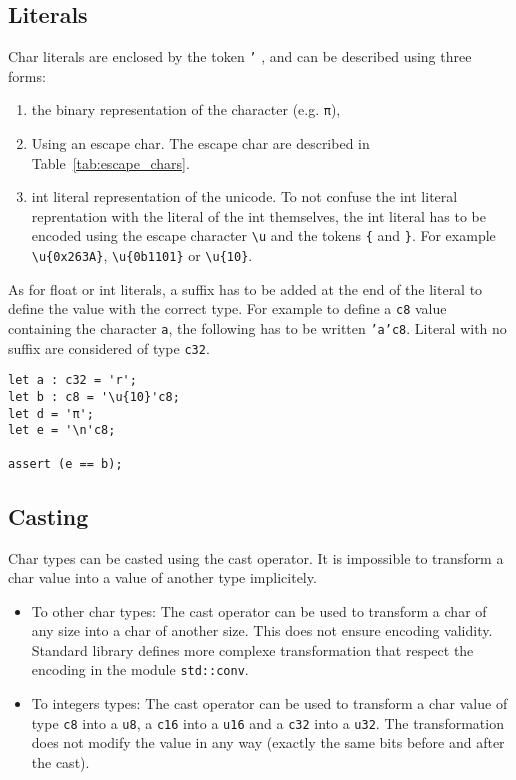 \subsection{Literals}
\label{sec:org73c4919}
Char literals are enclosed by the token \texttt{'} , and can be described using three forms:
\begin{enumerate}
\item the binary representation of the character (e.g. \texttt{π}),
\item Using an escape char. The escape char are described in Table~\ref{tab:escape_chars}.

\item int literal representation of the unicode. To not confuse the int literal
  reprentation with the literal of the int themselves, the int literal has to
  be encoded using the escape character \texttt{\textbackslash{}u} and the tokens \texttt{\{} and \texttt{\}}. For
  example \texttt{\textbackslash{}u\{0x263A\}}, \texttt{\textbackslash{}u\{0b1101\}} or \texttt{\textbackslash{}u\{10\}}.
\end{enumerate}

As for float or int literals, a suffix has to be added at the end of the literal
to define the value with the correct type. For example to define a \texttt{c8} value
containing the character \texttt{a}, the following has to be written \texttt{'a'c8}. Literal
with no suffix are considered of type \texttt{c32}.

\begin{lstlisting}[style=coloredverbatim]
let a : c32 = 'r';
let b : c8 = '\u{10}'c8;
let d = 'π';
let e = '\n'c8;

assert (e == b);
\end{lstlisting}

\subsection{Casting}
\label{sec:org16d703f}

Char types can be casted using the cast operator. It is impossible to transform a char value into a value of another type implicitely.

\begin{itemize}
\item To other char types: The cast operator can be used to transform a char of
  any size into a char of another size. This does not ensure encoding validity.
  Standard library defines more complexe transformation that respect the
  encoding in the module \texttt{std::conv}.

\item To integers types: The cast operator can be used to transform a char
  value of type \texttt{c8} into a \texttt{u8}, a \texttt{c16} into a
  \texttt{u16} and a \texttt{c32} into a \texttt{u32}. The transformation does
  not modify the value in any way (exactly the same bits before and after the
  cast).
\end{itemize}

